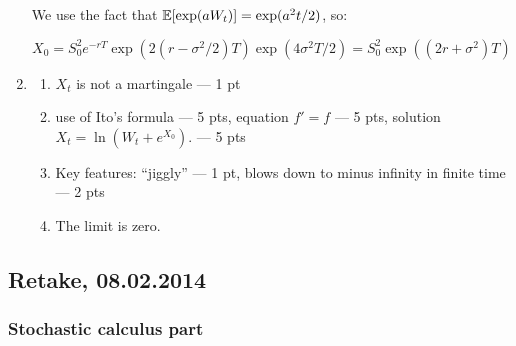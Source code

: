 \documentclass[12pt, a4paper]{article}
\begin{document}
\begin{enumerate}
We use the fact that $\operatorname{\mathbb{E}}[\exp(a W_t)]=\exp(a^2 t/ 2)$, so:

\[
X_0=  S_0^2 e^{-rT}\exp(2(r-\sigma^2/2)T) \exp(4\sigma^2 T/2) = S_0^2 \exp((2r+\sigma^2)T)
\]

\item
\begin{enumerate}
\item  $X_t$ is not a martingale — 1 pt
\item use of Ito's formula — 5 pts, equation $f'=f$ — 5 pts, solution $X_t=\ln(W_t+e^{X_0})$. — 5 pts
\item Key features: ``jiggly'' —  1 pt, blows down to minus infinity in finite time — 2 pts
\item The limit is zero.
\end{enumerate}

\end{enumerate}

\subsection{Retake, 08.02.2014}

\subsubsection*{Stochastic calculus part}
\end{document}
